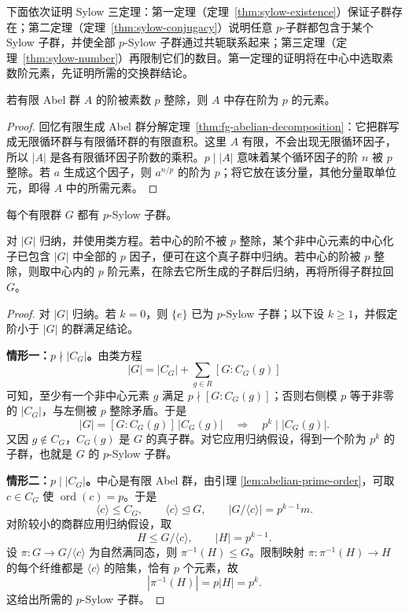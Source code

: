 \documentclass[lang=cn,a4paper,fontset=none,zihao=false,10pt,openany,twoside]{beautybook}
\numberwithin{algorithm}{chapter}
\begin{document}
下面依次证明 Sylow 三定理：第一定理（定理~\ref{thm:sylow-existence}）保证子群存在；第二定理（定理~\ref{thm:sylow-conjugacy}）说明任意 $p$-子群都包含于某个 Sylow 子群，并使全部 $p$-Sylow 子群通过共轭联系起来；第三定理（定理~\ref{thm:sylow-number}）再限制它们的数目。第一定理的证明将在中心中选取素数阶元素，先证明所需的交换群结论。
\begin{lemma}\label{lem:abelian-prime-order}
若有限 Abel 群 $A$ 的阶被素数 $p$ 整除，则 $A$ 中存在阶为 $p$ 的元素。
\end{lemma}
\begin{proof}
回忆有限生成 Abel 群分解定理~\ref{thm:fg-abelian-decomposition}：它把群写成无限循环群与有限循环群的有限直积。这里 $A$ 有限，不会出现无限循环因子，所以 $|A|$ 是各有限循环因子阶数的乘积。$p\mid|A|$ 意味着某个循环因子的阶 $n$ 被 $p$ 整除。若 $a$ 生成这个因子，则 $a^{n/p}$ 的阶为 $p$；将它放在该分量，其他分量取单位元，即得 $A$ 中的所需元素。
\end{proof}

\begin{theorem}\label{thm:sylow-existence}
每个有限群 $G$ 都有 $p$-Sylow 子群。
\end{theorem}
\begin{remark}[中心化子与中心商群的两条归纳路线]
对 $|G|$ 归纳，并使用类方程。若中心的阶不被 $p$ 整除，某个非中心元素的中心化子已包含 $|G|$ 中全部的 $p$ 因子，便可在这个真子群中归纳。若中心的阶被 $p$ 整除，则取中心内的 $p$ 阶元素，在除去它所生成的子群后归纳，再将所得子群拉回 $G$。
\end{remark}
\begin{proof}
对 $|G|$ 归纳。若 $k=0$，则 $\{e\}$ 已为 $p$-Sylow 子群；以下设 $k\ge1$，并假定阶小于 $|G|$ 的群满足结论。

\par\smallskip\noindent\textbf{情形一：$p\nmid|C_G|$。}\quad 由类方程
\[
 |G|=|C_G|+\sum_{g\in R}[G:C_G(g)]
\]
可知，至少有一个非中心元素 $g$ 满足 $p\nmid[G:C_G(g)]$；否则右侧模 $p$ 等于非零的 $|C_G|$，与左侧被 $p$ 整除矛盾。于是
\[
 |G|=[G:C_G(g)]\,|C_G(g)|
 \quad\Longrightarrow\quad p^k\mid|C_G(g)|.
\]
又因 $g\notin C_G$，$C_G(g)$ 是 $G$ 的真子群。对它应用归纳假设，得到一个阶为 $p^k$ 的子群，也就是 $G$ 的 $p$-Sylow 子群。

\par\smallskip\noindent\textbf{情形二：$p\mid|C_G|$。}\quad 中心是有限 Abel 群，由引理 \ref{lem:abelian-prime-order}，可取 $c\in C_G$ 使 $\operatorname{ord}(c)=p$。于是
\[
 \langle c\rangle\le C_G,\qquad
 \langle c\rangle\trianglelefteq G,\qquad
 |G/\langle c\rangle|=p^{k-1}m.
\]
对阶较小的商群应用归纳假设，取
\[
 H\le G/\langle c\rangle,\qquad |H|=p^{k-1}.
\]
设 $\pi:G\to G/\langle c\rangle$ 为自然满同态，则 $\pi^{-1}(H)\le G$。限制映射 $\pi:\pi^{-1}(H)\to H$ 的每个纤维都是 $\langle c\rangle$ 的陪集，恰有 $p$ 个元素，故
\[
 |\pi^{-1}(H)|=p|H|=p^k.
\]
这给出所需的 $p$-Sylow 子群。
\end{proof}
\end{document}
